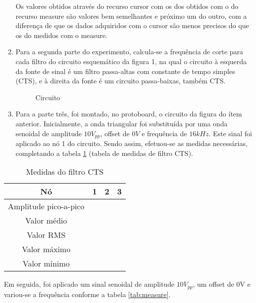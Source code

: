 \documentclass[a4paper]{article} %
\begin{document}
\begin{enumerate}
Os valores obtidos através do recurso cursor com os dos obtidos com o do recurso measure são valores bem semelhantes e próximo um do outro, com a diferença de que os dados adquiridos com o cursor são menos precisos do que os do medidos com o measure.

\item Para a segunda parte do experimento, calcula-se a frequência de corte para cada filtro do circuito esquemático da figura 1, na qual o circuito à esquerda da fonte de sinal é um filtro passa-altas com constante de tempo simples (CTS), e à direita da fonte é um circuito passa-baixas, também CTS. 


\begin{figure}[h]
\centerline{}
\caption{Circuito \label{tab:circ}}
\end{figure}


\item Para a parte três, foi montado, no protoboard, o circuito da figura do ítem anterior. Inicialmente, a onda triangular foi substituída por uma onda senoidal de amplitude $10V_{pp}$, offset de $0V$ e frequência de $16kHz$. Este sinal foi aplicado ao nó 1 do circuito. Sendo assim, efetuou-se as medidas necessárias, completando a tabela \ref{tab:Medidas-do-filtro} (tabela de medidas de filtro CTS).
\end{enumerate}



%
\begin{table}
\begin{centering}
\begin{tabular}{|c|c|c|c|}
\hline 
Nó & 1 & 2 & 3\tabularnewline
\hline
\hline 
Amplitude pico-a-pico &  &  & \tabularnewline
\hline 
Valor médio &  &  & \tabularnewline
\hline 
Valor RMS &  &  & \tabularnewline
\hline 
Valor máximo &  &  & \tabularnewline
\hline 
Valor mínimo &  &  & \tabularnewline
\hline
\end{tabular}
\par\end{centering}

\caption{Medidas do filtro CTS \label{tab:Medidas-do-filtro}}

\end{table}





Em seguida, foi aplicado um sinal senoidal de amplitude $10V_{pp}$, um offset de 0V e variou-se a frequência conforme a tabela \ref{tab:measure}. 
\end{document}
